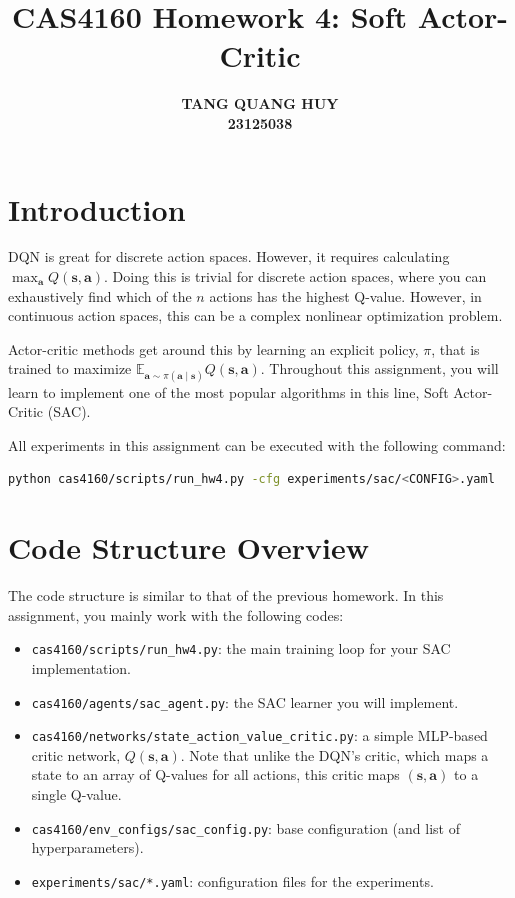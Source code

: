 \documentclass{article}
\title{CAS4160 Homework 4: Soft Actor-Critic}
\author{
    \textbf{TANG QUANG HUY} \\
    \textbf{23125038}
}
\def\rva{{\mathbf{a}}}
\def\rvs{{\mathbf{s}}}
\begin{document}
\maketitle



\section{Introduction}

DQN is great for discrete action spaces. However, it requires calculating $\max_\rva Q(\rvs, \rva)$. Doing this is trivial for discrete action spaces, where you can exhaustively find which of the $n$ actions has the highest Q-value. However, in continuous action spaces, this can be a complex nonlinear optimization problem.

Actor-critic methods get around this by learning an explicit policy, $\pi$, that is trained to maximize $\mathbb{E}_{\rva \sim \pi(\rva \mid \rvs)} Q(\rvs, \rva)$. Throughout this assignment, you will learn to implement one of the most popular algorithms in this line, Soft Actor-Critic (SAC).

All experiments in this assignment can be executed with the following command:
\begin{lstlisting}[language=bash,breaklines=true]
  python cas4160/scripts/run_hw4.py -cfg experiments/sac/<CONFIG>.yaml
\end{lstlisting}



\section{Code Structure Overview}

The code structure is similar to that of the previous homework. In this assignment, you mainly work with the following codes:
\begin{itemize}
    \item \verb|cas4160/scripts/run_hw4.py|: the main training loop for your SAC implementation.
    \item \verb|cas4160/agents/sac_agent.py|: the SAC learner you will implement.
    \item \verb|cas4160/networks/state_action_value_critic.py|: a simple MLP-based critic network, $Q(\rvs, \rva)$. Note that unlike the DQN's critic, which maps a state to an array of Q-values for all actions, this critic maps $(\rvs, \rva)$ to a single Q-value.
    \item \verb|cas4160/env_configs/sac_config.py|: base configuration (and list of hyperparameters).
    \item \verb|experiments/sac/*.yaml|: configuration files for the experiments.
\end{itemize}
\end{document}
